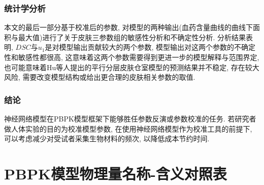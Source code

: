 \documentclass[a4paper,punct=banjiao,twoside]{ctexrep}
\theoremstyle{plain}
\theoremstyle{definition}
\theoremstyle{remark}
\begin{document}
\subsection*{统计学分析}
本文的最后一部分基于校准后的参数, 对模型的两种输出(血药含量曲线的曲线下面积与最大值)进行了关于皮肤三参数组的敏感性分析和不确定性分析. 分析结果表明, $DSC$与$u_1$是对模型输出贡献较大的两个参数, 模型输出对这两个参数的不确定性和敏感性都很高, 这意味着这两个参数需要得到更进一步的模型解释与范围界定, 也可能意味着Hu等人\cite{11}提出的平行分层皮肤仓室模型的预测结果并不稳定, 存在较大风险, 需要改变模型结构或给出更合理的皮肤相关参数的取值.

\subsection*{结论}
神经网络模型在PBPK模型框架下能够胜任参数反演或参数校准的任务. 若研究者做人体实验的目的为校准模型参数, 在使用神经网络模型作为校准工具的前提下, 可以考虑减少对受试者采集生物材料的频次, 以降低成本节约时间.

\appendix

\chapter{PBPK模型物理量名称-含义对照表}
\end{document}
